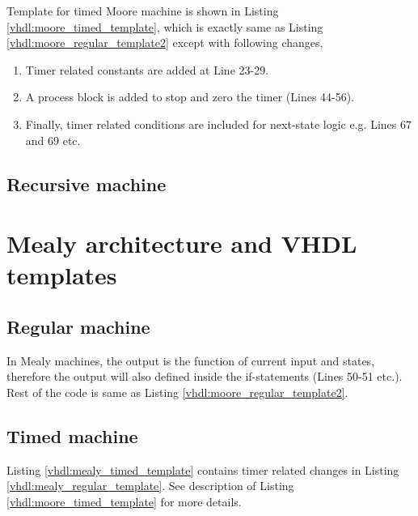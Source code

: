 Template for timed Moore machine is shown in Listing \ref{vhdl:moore_timed_template}, which is exactly same as Listing \ref{vhdl:moore_regular_template2} except with following changes, 
\begin{enumerate}
	\item Timer related constants are added at Line 23-29.
	\item A process block is added to stop and zero the timer (Lines 44-56). 
	\item Finally, timer related conditions are included for next-state logic e.g.  Lines 67 and 69 etc.
	
\end{enumerate}





\subsection{Recursive machine}

\section{Mealy architecture and VHDL templates} \label{sec:MealyTemplates}
\subsection{Regular machine}
In Mealy machines, the output is the function of current input and states, therefore the output will also defined inside the if-statements (Lines 50-51 etc.). Rest of the code is same as Listing \ref{vhdl:moore_regular_template2}. 



\subsection{Timed machine}
Listing \ref{vhdl:mealy_timed_template} contains timer related changes in Listing \ref{vhdl:mealy_regular_template}. See description of Listing \ref{vhdl:moore_timed_template} for more details. 





